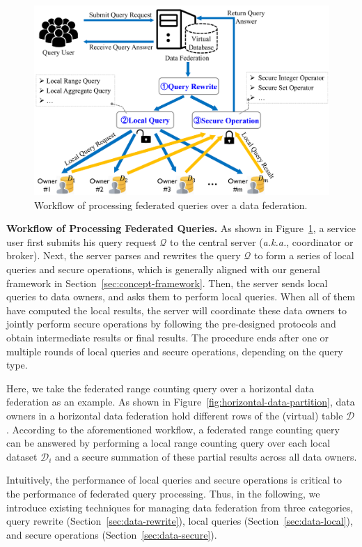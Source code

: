 \documentclass[11pt]{article}
\newcommand{\aka}{\textit{a.k.a.},\xspace}
\newcommand\figref[1]{Figure~\ref{#1}}
\newcommand\secref[1]{Section~\ref{#1}}
\newcommand{\fakeparagraph}[1]{\vspace{1mm}\noindent\textbf{#1.}}
\newcommand{\D}{\mathcal{D}}
\newcommand{\Q}{\mathcal{Q}}
\begin{document}
\begin{figure}[t]
\centering
    \includegraphics[width=0.8\linewidth]{submissions/YongxinTong/fig/query.png}
	\caption{Workflow of processing federated queries over a data federation.}\label{fig:workflow-query}
\end{figure}

\fakeparagraph{Workflow of Processing Federated Queries}
As shown in \figref{fig:workflow-query}, a service user first submits his query request $\Q$ to the central server (\aka coordinator or broker).
Next, the server parses and rewrites the query $\Q$ to form a series of local queries and secure operations, which is generally aligned with our general framework in \secref{sec:concept-framework}.
Then, the server sends local queries to data owners, and asks them to perform local queries.
When all of them have computed the local results, the server will coordinate these data owners to jointly perform secure operations by following the pre-designed protocols and obtain intermediate results or final results.
The procedure ends after one or multiple rounds of local queries and secure operations, depending on the query type.

Here, we take the federated range counting query over a horizontal data federation as an example.
As shown in \figref{fig:horizontal-data-partition}, data owners in a horizontal data federation hold different rows of the (virtual) table $\D$.
According to the aforementioned workflow, a federated range counting query can be answered by performing a local range counting query over each local dataset $\D_i$ and a secure summation of these partial results across all data owners.

Intuitively, the performance of local queries and secure operations is critical to the performance of federated query processing.
Thus, in the following, we introduce existing techniques for managing data federation from three categories, query rewrite (\secref{sec:data-rewrite}), local queries (\secref{sec:data-local}), and secure operations (\secref{sec:data-secure}).
\end{document}
